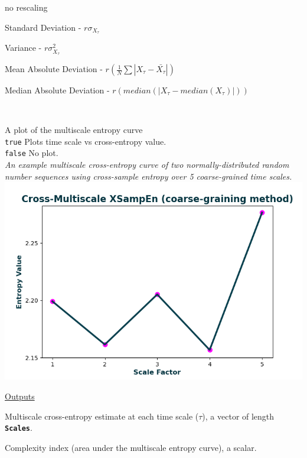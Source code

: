\documentclass[12pt, a4paper, titlepage, openany]{book}
\begin{document}
\begin{description}[labelsep=1cm, labelwidth=2cm, nosep, style=multiline,leftmargin=3cm]
	\begin{description}[labelsep=5em, labelwidth=4em, nosep,style=multiline,leftmargin=2cm]
		\item[0]	no rescaling
		\item[1]    Standard Deviation          - $r\sigma_{X_\tau}$
        \item[2]    Variance                    - $r\sigma_{X_\tau}^2$
        \item[3]    Mean Absolute Deviation     - $r(\frac{1}{N} \sum |X_{\tau} - \bar{X_{\tau}}|) $
        \item[4]    Median Absolute Deviation   - $r(median(|X_{\tau} - median(X_{\tau})|)) $
	\end{description}
\ \\ 
\item[\texttt{Plotx}]		A plot of the multiscale entropy curve\\
							\texttt{true} \hspace{15pt} Plots time scale vs cross-entropy value.\\
							\texttt{false}\hspace{12pt} No plot.\\ 	
						\textit{An example multiscale cross-entropy curve of two normally-distributed random number sequences using cross-sample entropy over 5 coarse-grained time scales.}\\
							\includegraphics[scale=.7]{XMSEn1.png}
\end{description}

\noindent \ul{Outputs}
\begin{description}[labelsep=1cm, labelwidth=2cm, nosep, style=multiline,leftmargin=3cm]\footnotesize
\item[\texttt{MSx}]		Multiscale cross-entropy estimate at each time scale ($\tau$), a vector of length 											\textbf{\texttt{Scales}}.
\item[\texttt{Ci}]		Complexity index (area under the multiscale entropy curve), a scalar.
\end{description}
\end{document}
